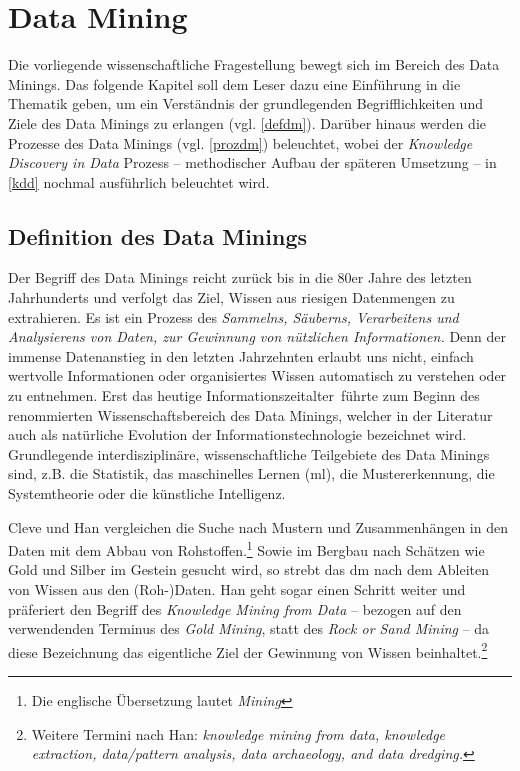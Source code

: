 \section{Data Mining}
\label{dm}
Die vorliegende wissenschaftliche Fragestellung bewegt sich im Bereich des Data Minings. Das folgende Kapitel soll dem Leser dazu eine Einführung in die Thematik geben, um ein Verständnis der grundlegenden Begrifflichkeiten und Ziele des Data Minings zu erlangen (vgl. \vref{defdm}). Darüber hinaus werden die Prozesse des Data Minings (vgl. \vref{prozdm}) beleuchtet, wobei der \textit{Knowledge Discovery in Data} Prozess -- methodischer Aufbau der späteren Umsetzung -- in \vref{kdd} nochmal ausführlich beleuchtet wird.

\subsection{Definition des Data Minings}
\label{defdm}

Der Begriff des Data Minings reicht zurück bis in die 80er Jahre des letzten Jahrhunderts und verfolgt das Ziel, Wissen aus riesigen Datenmengen zu extrahieren. Es ist ein Prozess des \glqq  \textit{Sammelns, Säuberns, Verarbeitens und Analysierens von Daten, zur Gewinnung von nützlichen Informationen.}\grqq{} Denn der immense Datenanstieg in den letzten Jahrzehnten erlaubt uns nicht, einfach wertvolle Informationen oder organisiertes Wissen automatisch zu verstehen oder zu entnehmen. Erst das heutige \glqq Informationszeitalter\grqq~führte zum Beginn des renommierten Wissenschaftsbereich des Data Minings, welcher in der Literatur auch als natürliche Evolution der Informationstechnologie bezeichnet wird. Grundlegende interdisziplinäre, wissenschaftliche Teilgebiete des Data Minings sind, z.B. die Statistik, das maschinelles Lernen (\gls{ml}), die Mustererkennung, die Systemtheorie oder die künstliche Intelligenz.


Cleve und Han vergleichen die Suche nach Mustern und Zusammenhängen in den Daten mit dem Abbau von Rohstoffen.\footnote{Die englische Übersetzung lautet \textit{\glqq Mining\grqq}} Sowie im Bergbau nach Schätzen wie Gold und Silber im Gestein gesucht wird, so strebt das \gls{dm} nach dem Ableiten von Wissen aus den (Roh-)Daten. Han geht sogar einen Schritt weiter und präferiert den Begriff des \textit{Knowledge Mining from Data} -- bezogen auf den verwendenden Terminus des \textit{Gold Mining}, statt des \textit{Rock or Sand Mining} -- da diese Bezeichnung das eigentliche Ziel der Gewinnung von Wissen beinhaltet.\footnote{Weitere Termini nach Han: \textit{knowledge mining from data, knowledge extraction, data/pattern analysis, data archaeology, and data dredging.}}

